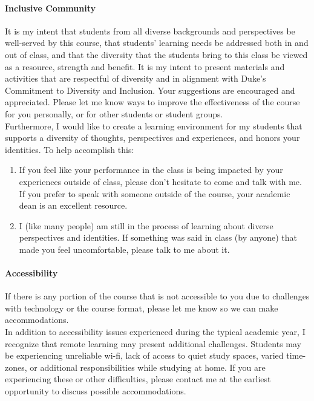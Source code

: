 \documentclass[11pt]{article}
\begin{document}
\paragraph{Inclusive Community}

It is my intent that students from all diverse backgrounds and perspectives be well-served by this course, that students’ learning needs be addressed both in and out of class, and that the diversity that the students bring to this class be viewed as a resource, strength and benefit. It is my intent to present materials and activities that are respectful of diversity and in alignment with Duke’s Commitment to Diversity and Inclusion. Your suggestions are encouraged and appreciated. Please let me know ways to improve the effectiveness of the course for you personally, or for other students or student groups. \\

Furthermore, I would like to create a learning environment for my students that supports a diversity of thoughts, perspectives and experiences, and honors your identities. To help accomplish this:

\begin{enumerate}
\item If you feel like your performance in the class is being impacted by your experiences outside of class, please don’t hesitate to come and talk with me. If you prefer to speak with someone outside of the course, your academic dean is an excellent resource.
\item   I (like many people) am still in the process of learning about diverse perspectives and identities. If something was said in class (by anyone) that made you feel uncomfortable, please talk to me about it.
\end{enumerate}

\paragraph{Accessibility}

If there is any portion of the course that is not accessible to you due to challenges with technology or the course format, please let me know so we can make accommodations.\\

In addition to accessibility issues experienced during the typical academic year, I recognize that remote learning may present additional challenges. Students may be experiencing unreliable wi-fi, lack of access to quiet study spaces, varied time-zones, or additional responsibilities while studying at home. If you are experiencing these or other difficulties, please contact me at the earliest opportunity to discuss possible accommodations. \\
\end{document}
